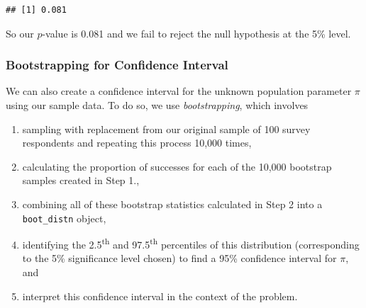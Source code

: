 \documentclass[]{tufte-book}
\newenvironment{Shaded}{\begin{snugshade}}{\end{snugshade}}
\newcommand{\KeywordTok}[1]{\textcolor[rgb]{0.13,0.29,0.53}{\textbf{{#1}}}}
\newcommand{\DataTypeTok}[1]{\textcolor[rgb]{0.13,0.29,0.53}{{#1}}}
\newcommand{\DecValTok}[1]{\textcolor[rgb]{0.00,0.00,0.81}{{#1}}}
\newcommand{\FloatTok}[1]{\textcolor[rgb]{0.00,0.00,0.81}{{#1}}}
\newcommand{\StringTok}[1]{\textcolor[rgb]{0.31,0.60,0.02}{{#1}}}
\newcommand{\OtherTok}[1]{\textcolor[rgb]{0.56,0.35,0.01}{{#1}}}
\newcommand{\NormalTok}[1]{{#1}}
\providecommand{\tightlist}{%
  \setlength{\itemsep}{0pt}\setlength{\parskip}{0pt}}
\begin{document}
\begin{Shaded}
\end{Shaded}

\begin{verbatim}
## [1] 0.081
\end{verbatim}

So our \(p\)-value is 0.081 and we fail to reject the null hypothesis at
the 5\% level.

\subsubsection{Bootstrapping for Confidence
Interval}\label{bootstrapping-for-confidence-interval-1}

We can also create a confidence interval for the unknown population
parameter \(\pi\) using our sample data. To do so, we use
\emph{bootstrapping}, which involves

\begin{enumerate}
\def\labelenumi{\arabic{enumi}.}
\tightlist
\item
  sampling with replacement from our original sample of 100 survey
  respondents and repeating this process 10,000 times,
\item
  calculating the proportion of successes for each of the 10,000
  bootstrap samples created in Step 1.,
\item
  combining all of these bootstrap statistics calculated in Step 2 into
  a \texttt{boot\_distn} object,
\item
  identifying the 2.5\textsuperscript{th} and 97.5\textsuperscript{th}
  percentiles of this distribution (corresponding to the 5\%
  significance level chosen) to find a 95\% confidence interval for
  \(\pi\), and
\item
  interpret this confidence interval in the context of the problem.
\end{enumerate}

\begin{Shaded}
\end{Shaded}
\end{document}
